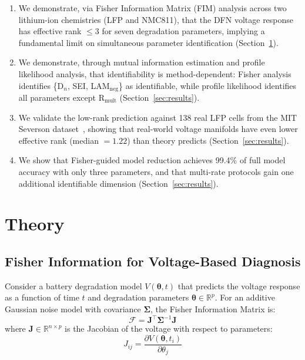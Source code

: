 \documentclass[preprint,12pt]{elsarticle}
\begin{document}
\begin{enumerate}
\item We demonstrate, via Fisher Information Matrix (FIM) analysis across two lithium-ion chemistries (LFP and NMC811), that the DFN voltage response has effective rank $\leq 3$ for seven degradation parameters, implying a fundamental limit on simultaneous parameter identification (Section~\ref{sec:theory}).

\item We demonstrate, through mutual information estimation and profile likelihood analysis, that identifiability is method-dependent: Fisher analysis identifies \{D$_n$, SEI, LAM$_{\mathrm{neg}}$\} as identifiable, while profile likelihood identifies all parameters except R$_{\mathrm{mult}}$ (Section~\ref{sec:results}).

\item We validate the low-rank prediction against 138 real LFP cells from the MIT Severson dataset~\cite{Severson2019}, showing that real-world voltage manifolds have even lower effective rank (median $= 1.22$) than theory predicts (Section~\ref{sec:results}).

\item We show that Fisher-guided model reduction achieves 99.4\% of full model accuracy with only three parameters, and that multi-rate protocols gain one additional identifiable dimension (Section~\ref{sec:results}).
\end{enumerate}

\section{Theory}
\label{sec:theory}

\subsection{Fisher Information for Voltage-Based Diagnosis}
\label{sec:fisher}

Consider a battery degradation model $V(\bm{\theta}, t)$ that predicts the voltage response as a function of time $t$ and degradation parameters $\bm{\theta} \in \mathbb{R}^p$.
For an additive Gaussian noise model with covariance $\bm{\Sigma}$, the Fisher Information Matrix is:
\begin{equation}
\mathcal{F} = \bm{J}^\top \bm{\Sigma}^{-1} \bm{J}
\label{eq:fim}
\end{equation}
where $\bm{J} \in \mathbb{R}^{n \times p}$ is the Jacobian of the voltage with respect to parameters:
\begin{equation}
J_{ij} = \frac{\partial V(\bm{\theta}, t_i)}{\partial \theta_j}
\label{eq:jacobian}
\end{equation}
\end{document}
